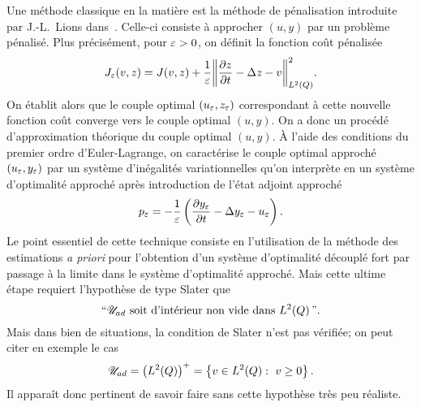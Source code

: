 Une méthode classique en la matière est la méthode de pénalisation
introduite par J.-L.~Lions dans~\cite{lions2}. Celle-ci consiste à
approcher $(u,y)$ par un problème pénalisé. Plus précisément, pour $\varepsilon >
0$, on définit la fonction coût pénalisée
\begin{equation*}\label{eq:penalized-cost-function}
    J_{\veps}\!\left({v,z}\right) = J(v,z) + \dfrac{1}{\veps}\normecq{%
        \primetemps{z} - \Delta z - v
    }.
\end{equation*}
On établit alors que le couple optimal $\left({u_{\varepsilon},z_{\varepsilon}}\right)$
correspondant à cette nouvelle fonction coût converge vers le couple
optimal $(u,y)$. On a donc un procédé d'approximation théorique du couple
optimal $(u,y)$. À l'aide des conditions du premier ordre d'Euler-Lagrange,
on caractérise le couple optimal approché
$\left({u_{\varepsilon},y_{\varepsilon}}\right)$ par un système d'inégalités
variationnelles qu'on interprète en un système d'optimalité approché après
introduction de l'état adjoint approché
\begin{equation*}
    p_{\veps} = -\dfrac{1}{\veps}\left({%
        \primetemps{y_{\veps}} - \Delta y_{\veps} - u_{\veps}
    }\right).
\end{equation*}
Le point essentiel de cette technique consiste en l'utilisation de la
méthode des estimations \textit{a priori} pour l'obtention d'un système
d'optimalité découplé fort par passage à la limite dans le système
d'optimalité approché. Mais cette ultime étape requiert l'hypothèse de type
Slater que
\begin{equation}\label{eq:slater-type-assumption}
    \text{“}{\mathscr{U}}_{ad}\ \text{soit d'intérieur non vide dans}\
    L^{2}\!\left({Q}\right)\text{”}.
\end{equation}
Mais dans bien de situations, la condition de Slater n'est pas vérifiée; on
peut citer en exemple le cas
\begin{equation*}
    \uad = {\left({\Ldeux{Q}}\right)}^{+} = \left\{{%
        v\in\Ldeux{Q}:\ v\geq 0
    }\right\}.
\end{equation*}
Il apparaît donc pertinent de savoir faire sans cette hypothèse très peu
réaliste.

